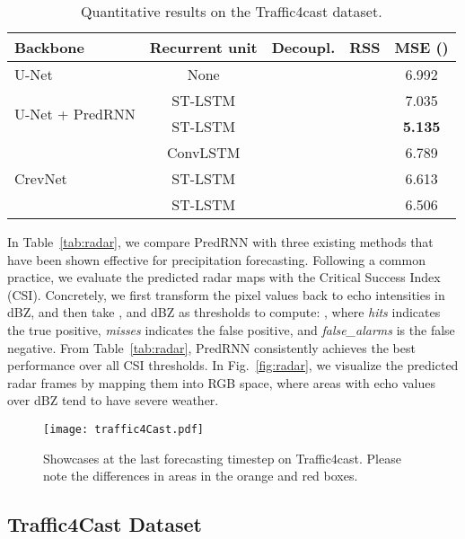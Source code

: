 \documentclass[10pt,journal,compsoc]{IEEEtran}
\newcommand{\tab}[1]{Table~\ref{#1}}
\newcommand{\fig}[1]{Fig.~\ref{#1}}
\begin{document}
\begin{table}[t]
    \vskip 0.05in
    \caption{Quantitative results on the Traffic4cast dataset.}
    \vskip -0.05in
    \label{tab:traffic4cast_final_result}
    \centering
    \begin{tabular}{lcccc}
    \toprule
    Backbone & Recurrent unit & Decoupl. & RSS & MSE () \\
    \midrule
    U-Net \cite{ronneberger2015u} & None &  &  &
    6.992  \\
    \midrule
    \multirow{2}{*}{U-Net + PredRNN} 
    & ST-LSTM &  &  & 7.035 \\
    & ST-LSTM &  &  & \textbf{5.135} \\
    \midrule
    \multirow{3}{*}{CrevNet \cite{yu2020efficient}} & ConvLSTM &  &  &
    6.789  \\
    & ST-LSTM &  &  & 6.613 \\
    & ST-LSTM &  &  & 6.506 \\
    \bottomrule
    \end{tabular}
    \vspace{-10pt}
\end{table}

In \tab{tab:radar}, we compare PredRNN with three existing methods that have been shown effective for precipitation forecasting.
Following a common practice, we evaluate the predicted radar maps with the Critical Success Index (CSI). Concretely, we first transform the pixel values back to echo intensities in dBZ, and then take ,  and  dBZ as thresholds to compute: , where \textit{hits} indicates the true positive, \textit{misses} indicates the false positive, and \textit{false\_alarms} is the false negative.
From \tab{tab:radar}, PredRNN consistently achieves the best performance over all CSI thresholds.
In \fig{fig:radar}, we visualize the predicted radar frames by mapping them into RGB space, where areas with echo values over  dBZ tend to have severe weather. 

\begin{figure}[t]
  \centering
  \texttt{[image: traffic4Cast.pdf]}
   \vskip -0.02in
  \caption{Showcases at the last forecasting timestep on Traffic4cast. Please note the differences in areas in the orange and red boxes.}
  \label{fig:traffic4cast_showcase}
  \vspace{-5pt}
\end{figure} 

\subsection{Traffic4Cast Dataset}
\end{document}
